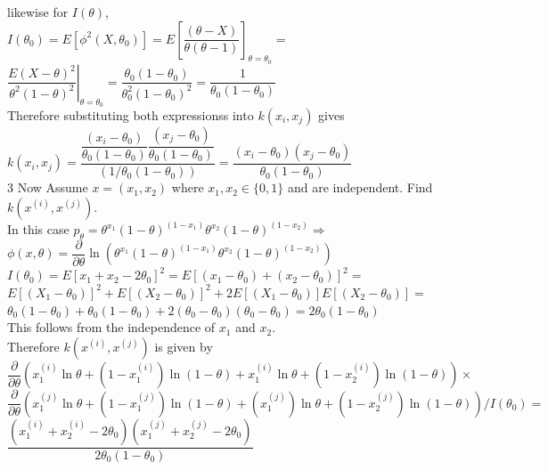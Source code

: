 \documentclass[18pt]{article}
\begin{document}
\begin{flushleft}
\vspace{.4cm}
likewise for $I(\theta)$,\\
\vspace{.4cm}
$I(\theta_0)=E[\phi^2(X,\theta_0)]=E\left[\dfrac{(\theta-X)}{\theta(\theta-1)}\right]_{\theta=\theta_0}=$
$\left.\dfrac{E(X-\theta)^2}{\theta^2(1-\theta)^2}\right|_{\theta=\theta_0} =\dfrac{\theta_0(1-\theta_0)}{\theta^2_0(1-\theta_0)^2}=\dfrac{1}{\theta_0(1-\theta_0)}$\\
\vspace{.4cm}
Therefore substituting both expressionss into $k(x_i,x_j)$ gives\\
\vspace{.4cm}
\hspace{2cm} $k(x_i,x_j)=\dfrac{\dfrac{(x_i-\theta_0)}{\theta_0(1-\theta_0)} \dfrac{(x_j-\theta_0)}{\theta_0(1-\theta_0)}}{(1/\theta_0(1-\theta_0))}=\dfrac{(x_i-\theta_0)(x_j-\theta_0)}{\theta_0(1-\theta_0)}$\\
\vspace{.4cm}
3 Now Assume $x=(x_1,x_2)$ where $x_1,x_2 \in \{0,1\}$ and are independent. Find $k(x^{(i)},x^{(j)})$.\\
\vspace{.4cm}
In this case $p_{\theta}=\theta^{x_1}(1-\theta)^{(1-x_1)} \theta^{x_2}(1-\theta)^{(1-x_2)}\Longrightarrow$\\
\vspace{.4cm}
$\phi(x,\theta)=\dfrac{\partial}{\partial\theta}\ln\left(\theta^{x_1}(1-\theta)^{(1-x_1)} \theta^{x_2}(1-\theta)^{(1-x_2)}\right)$\\
$I(\theta_0)=E[x_1+x_2-2\theta_0]^2=E[(x_1-\theta_0)+(x_2-\theta_0)]^2=$\\
$E[(X_1-\theta_0)]^2+E[(X_2-\theta_0)]^2+2E[(X_1-\theta_0)]E[(X_2-\theta_0)]=$\\
$\theta_0(1-\theta_0)+\theta_0(1-\theta_0)+2(\theta_0-\theta_0)(\theta_0-\theta_0)=2\theta_0(1-\theta_0)$\\
\vspace{.4cm}
This follows from the independence of $x_1$ and $x_2$.\\
\pagebreak
Therefore $k(x^{(i)},x^{(j)})$ is given by\\
\vspace{.4cm}
$\dfrac{\partial}{\partial\theta}\left(x_1^{(i)}\ln\theta+(1-x_1^{(i)})\ln(1-\theta)+x_1^{(i)}\ln\theta+(1-x_2^{(i)})\ln(1-\theta)\right)\times $\\
$\dfrac{\partial}{\partial\theta}\left(x_1^{(j)}\ln\theta+(1-x_1^{(j)})\ln(1-\theta)+(x_1^{(j)})\ln\theta+(1-x_2^{(j)})\ln(1-\theta)\right)/I(\theta_0)=$\\
\vspace{.4cm}
$\dfrac{\left(x_1^{(i)}+x_2^{(i)}-2\theta_0\right)\left(x_1^{(j)}+x_2^{(j)}-2\theta_0\right)}{2\theta_0(1-\theta_0)}$\\






\end{flushleft}
\end{document}
